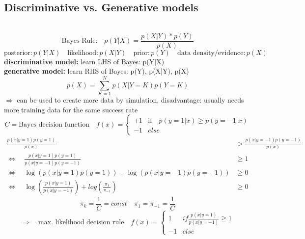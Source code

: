 \documentclass[11pt]{article}
\begin{document}
    \subsection{Discriminative vs. Generative models}
      \\
      \begin{equation*}
        \text{Bayes Rule:} \quad p(Y|X) = \frac{p(X|Y)*p(Y)}{p(X)}
      \end{equation*}
      \begin{equation*}
        \text{posterior}: p(Y|X) \quad \text{likelihood}: p(X|Y) \quad \text{prior}: p(Y)
        \quad \text{data density/evidence}: p(X)
      \end{equation*}
      \textbf{discriminative model:} learn LHS of Bayes: p(Y|X) \\
      \textbf{generative model:} learn RHS of Bayes: p(Y), p(X|Y), p(X)
      \begin{equation*}
        p(X) = \sum_{K=1}^{N} p(X|Y=K)p(Y=K)
      \end{equation*}
      $\Rightarrow$ can be used to create more data by simulation, disadvantage:
      usually needs more training data for the same success rate
      \begin{equation*}
        C = \text{Bayes decision function} \quad f(x) = \begin{cases}
        +1 & \text{if} \quad p(y=1|x) \geq p(y = -1|x) \\
        -1 & else
        \end{cases}
      \end{equation*}
      \begin{equation*}
        \begin{align*}
          \frac{p(x|y=1)p(y=1)}{p(x)} &> \frac{p(x|y=-1)p(y=-1)}{p(x)} \\
          \iff \quad \frac{p(x|y=1) p(y=1)}{p(x|y=-1)p(y=-1)} &\geq 1 \\
          \iff \quad \log(p(x|y=1)p(y=1)) - \log(p(x|y=-1)p(y=-1)) &\geq 0 \\
          \iff \quad \log(\frac{p(x|y=1)}{p(x|y=-1)}) + log(\frac{\pi_{1}}{\pi_{-1}}) &\geq 0
        \end{align*}
      \end{equation*}
      \begin{equation*}
        \pi_{k} = \frac{1}{C} = const \quad \pi_{1} = \pi_{-1} = \frac{1}{C}
      \end{equation*}
      \begin{equation*}
        \Rightarrow \quad \text{max. likelihood decision rule} \quad
        f(x) = \begin{cases}
        1 & if \frac{p(x|y=1)}{p(x|y=-1)} \geq 1 \\
        -1 & else
        \end{cases}
      \end{equation*}
\end{document}
